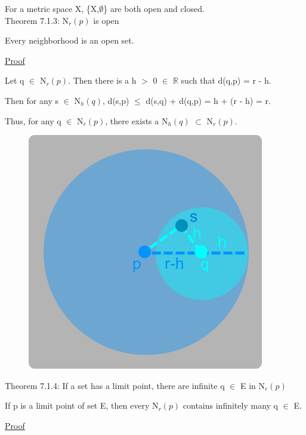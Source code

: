 	\qquad For a metric space X, \{X,$\emptyset$\} are both open and closed. \\

{ \color{red} Theorem 7.1.3: N$_r(p)$ is open } 

	\begin{adjustbox}{minipage=14cm, right, vspace=0.1cm 0cm}
		Every neighborhood is an open set.
	\end{adjustbox}

{ \color{magenta} \underline{Proof} } 
	
	Let q $\in$ N$_r(p)$. Then there is a h $>$ 0 $\in$ $\mathbb{R}$
	such that d(q,p) = r - h.

	Then for any s $\in$ N$_h(q)$,
	d(s,p) $\leq$  d(s,q) + d(q,p) = h + (r - h) = r.

	Thus, for any q $\in$ N$_r(p)$, there exists a N$_h(q)$ $\subset$ N$_r(p)$.

\begin{figure}[h]
	\centering
	\includegraphics[scale=0.34]{Images/7.1.3.png}
\end{figure}

\newpage

{ \color{red} Theorem 7.1.4: If a set has a limit point, there are infinite q
$\in$ E in N$_r(p)$ } 
	
	\begin{adjustbox}{minipage=14cm, right, vspace=0.1cm 0cm}
		If p is a limit point of set E, then every N$_r(p)$ contains infinitely many q $\in$ E.
	\end{adjustbox}

{ \color{magenta} \underline{Proof} } 
	
